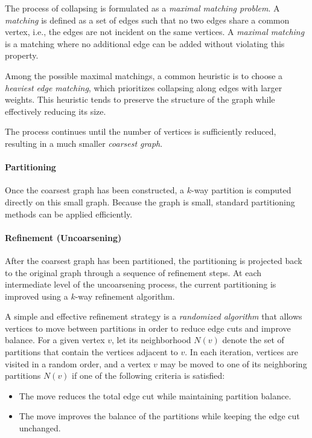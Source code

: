 \documentclass[12pt]{book}
\begin{document}
The process of collapsing is formulated as a \emph{maximal matching problem}. A \emph{matching} is defined as a set of edges such that no two edges share a common vertex, i.e., the edges are not incident on the same vertices. A \emph{maximal matching} is a matching where no additional edge can be added without violating this property.  

Among the possible maximal matchings, a common heuristic is to choose a \emph{heaviest edge matching}, which prioritizes collapsing along edges with larger weights. This heuristic tends to preserve the structure of the graph while effectively reducing its size.  

The process continues until the number of vertices is sufficiently reduced, resulting in a much smaller \emph{coarsest graph}.  

\paragraph{Partitioning}
Once the coarsest graph has been constructed, a $k$-way partition is computed directly on this small graph. Because the graph is small, standard partitioning methods can be applied efficiently.  

\paragraph{Refinement (Uncoarsening)}
After the coarsest graph has been partitioned, the partitioning is projected back to the original graph through a sequence of refinement steps. At each intermediate level of the uncoarsening process, the current partitioning is improved using a $k$-way refinement algorithm.  

A simple and effective refinement strategy is a \emph{randomized algorithm} that allows vertices to move between partitions in order to reduce edge cuts and improve balance. For a given vertex $v$, let its neighborhood $N(v)$ denote the set of partitions that contain the vertices adjacent to $v$. In each iteration, vertices are visited in a random order, and a vertex $v$ may be moved to one of its neighboring partitions $N(v)$ if one of the following criteria is satisfied:
\begin{itemize}
    \item The move reduces the total edge cut while maintaining partition balance.
    \item The move improves the balance of the partitions while keeping the edge cut unchanged.
\end{itemize}
\end{document}
